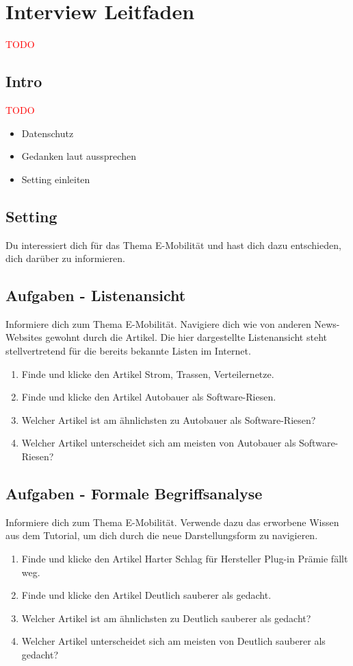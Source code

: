 \section{Interview Leitfaden}
\textcolor{red}{TODO}

\subsection{Intro}
\textcolor{red}{TODO}
\begin{itemize}
    \item Datenschutz
    \item Gedanken laut aussprechen
    \item Setting einleiten
\end{itemize}

\subsection{Setting}
Du interessiert dich für das Thema E-Mobilität und hast dich dazu entschieden, dich darüber zu informieren.

\subsection{Aufgaben - Listenansicht}
Informiere dich zum Thema E-Mobilität.
Navigiere dich wie von anderen News-Websites gewohnt durch die Artikel.
Die hier dargestellte Listenansicht steht stellvertretend für die bereits bekannte Listen im Internet.
\begin{enumerate}
    \item Finde und klicke den Artikel \glqq Strom, Trassen, Verteilernetze\grqq{}.
    \item Finde und klicke den Artikel \glqq Autobauer als Software-Riesen\grqq{}.
    \item Welcher Artikel ist am ähnlichsten zu \glqq Autobauer als Software-Riesen\grqq{}?
    \item Welcher Artikel unterscheidet sich am meisten von \glqq Autobauer als Software-Riesen\grqq{}?
\end{enumerate}

\subsection{Aufgaben - Formale Begriffsanalyse}
Informiere dich zum Thema E-Mobilität.
Verwende dazu das erworbene Wissen aus dem Tutorial, um dich durch die neue Darstellungsform zu navigieren.
\begin{enumerate}
    \item Finde und klicke den Artikel \glqq Harter Schlag für Hersteller Plug-in Prämie fällt weg\grqq{}.
    \item Finde und klicke den Artikel \glqq Deutlich sauberer als gedacht\grqq{}.
    \item Welcher Artikel ist am ähnlichsten zu \glqq Deutlich sauberer als gedacht\grqq{}?
    \item Welcher Artikel unterscheidet sich am meisten von \glqq Deutlich sauberer als gedacht\grqq{}?
\end{enumerate}